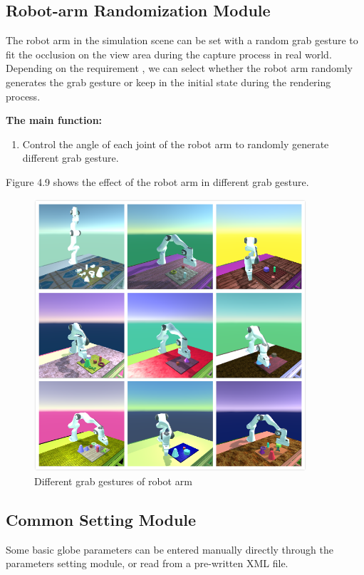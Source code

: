 \subsection{Robot-arm Randomization Module}
The robot arm in the simulation scene can be set with a random grab gesture to fit the occlusion on the view area during the capture process in real world. Depending on  the requirement , we can select whether the robot arm randomly generates the grab gesture or keep in the initial state during the rendering process.

\textbf{The main function:}
\begin{enumerate}
	\item Control the angle of each joint of the robot arm to randomly generate different grab gesture.
\end{enumerate}
Figure 4.9 shows the effect of the robot arm in different grab gesture.
\begin{figure}[h]
	\includegraphics[width=0.9\textwidth]{Figures/Section4_Robotarm.png} 
	\centering
	\captionsetup{justification=centering}
	\caption{Different grab gestures of robot arm}
	\label{fig:robotarm}
\end{figure}

\subsection{Common Setting Module}
Some basic globe parameters can be entered manually directly through the parameters setting module, or read from a pre-written XML file.

